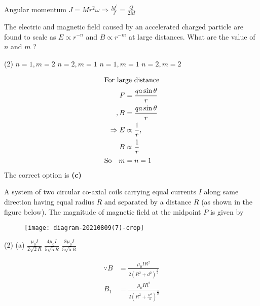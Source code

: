 \begin{enumerate}
\begin{answer}
		Angular momentum $J=M r^{2} \omega \Rightarrow \frac{M^{\prime}}{J}=\frac{Q}{2 M}$	
	\end{answer}
	\begin{minipage}{\textwidth}
		\item The electric and magnetic field caused by an accelerated charged particle are found to scale as $E \propto r^{-n}$ and $B \propto r^{-m}$ at large distances. What are the value of $n$ and $m$ ?
	\end{minipage}
	\begin{tasks}(2)
		\task[\textbf{A.}] $n=1, m=2$
		\task[\textbf{B.}] $n=2, m=1$
		\task[\textbf{C.}]$n=1, m=1$
		\task[\textbf{D.}]$n=2, m=2$
	\end{tasks}
	\begin{answer}
	\begin{align*}
		\intertext{For large distance}
	F&=\frac{q a \sin \theta}{r}\\
	, B&=\frac{q a \sin \theta}{r}\\
	\Rightarrow E &\propto \frac{1}{r},\\
	B &\propto \frac{1}{r} \\
	\text{So} \quad m&=n=1
	\end{align*}
		The correct option is \textbf{(c)}	
	\end{answer}
	\begin{minipage}{\textwidth}
		\item A system of two circular co-axial coils carrying equal currents $I$ along same direction having equal radius $R$ and separated by a distance $R$ (as shown in the figure below). The magnitude of magnetic field at the midpoint $P$ is given by
		\begin{figure}[H]
			\centering
			\texttt{[image: diagram-20210809(7)-crop]}
			\caption{}
			\label{}
		\end{figure}
	\end{minipage}
	\begin{tasks}(2)
		\task[\textbf{A.}](a) $\frac{\mu_{0} I}{2 \sqrt{2} R}$
		\task[\textbf{B.}]$\frac{4 \mu_{0} I}{5 \sqrt{5} R}$
		\task[\textbf{C.}]$\frac{8 \mu_{0} I}{5 \sqrt{5} R}$
	\end{tasks}
	\begin{answer}
		\begin{align*}
		\because B&=\frac{\mu_{0} I R^{2}}{2\left(R^{2}+d^{2}\right)^{\frac{3}{2}}}\\ B_{1}&=\frac{\mu_{0} I R^{2}}{2\left(R^{2}+\frac{R^{2}}{4}\right)^{\frac{3}{2}}}\\

\end{align*}
\end{answer}
\end{enumerate}
